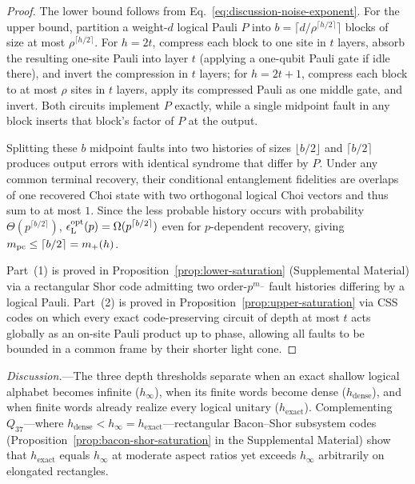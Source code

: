 \documentclass[aps,prl,reprint,notitlepage,nofootinbib,nobibnotes]{revtex4-2}
\begin{document}
\begin{proof}
The lower bound follows from Eq.~\eqref{eq:discussion-noise-exponent}. For the upper bound, partition a weight-\(d\) logical Pauli \(P\) into \(b=\lceil d/\rho^{\lceil h/2\rceil}\rceil\) blocks of size at most \(\rho^{\lceil h/2\rceil}\). For \(h=2t\), compress each block to one site in \(t\) layers, absorb the resulting one-site Pauli into layer \(t\) (applying a one-qubit Pauli gate if idle there), and invert the compression in \(t\) layers; for \(h=2t+1\), compress each block to at most \(\rho\) sites in \(t\) layers, apply its compressed Pauli as one middle gate, and invert. Both circuits implement \(P\) exactly, while a single midpoint fault in any block inserts that block's factor of \(P\) at the output.

Splitting these \(b\) midpoint faults into two histories of sizes \(\lfloor b/2\rfloor\) and \(\lceil b/2\rceil\) produces output errors with identical syndrome that differ by \(P\). Under any common terminal recovery, their conditional entanglement fidelities are overlaps of one recovered Choi state with two orthogonal logical Choi vectors and thus sum to at most \(1\). Since the less probable history occurs with probability \(\Theta(p^{\lceil b/2\rceil})\), \(\epsilon_{\rm L}^{\rm opt}(p)=\Omega(p^{\lceil b/2\rceil})\) even for \(p\)-dependent recovery, giving \(m_{\rm pc}\le\lceil b/2\rceil=m_+(h)\).

Part~(1) is proved in Proposition~\ref{prop:lower-saturation} (Supplemental Material) via a rectangular Shor code admitting two order-\(p^{m_-}\) fault histories differing by a logical Pauli. Part~(2) is proved in Proposition~\ref{prop:upper-saturation} via CSS codes on which every exact code-preserving circuit of depth at most \(t\) acts globally as an on-site Pauli product up to phase, allowing all faults to be bounded in a common frame by their shorter light cone.
\end{proof}

\textit{Discussion.}---The three depth thresholds separate when an exact shallow logical alphabet becomes infinite (\(h_\infty\)), when its finite words become dense (\(h_{\mathrm{dense}}\)), and when finite words already realize every logical unitary (\(h_{\mathrm{exact}}\)). Complementing \(Q_{37}\)---where \(h_{\mathrm{dense}}<h_\infty=h_{\mathrm{exact}}\)---rectangular Bacon--Shor subsystem codes (Proposition~\ref{prop:bacon-shor-saturation} in the Supplemental Material) show that \(h_{\mathrm{exact}}\) equals \(h_\infty\) at moderate aspect ratios yet exceeds \(h_\infty\) arbitrarily on elongated rectangles.
\end{document}
